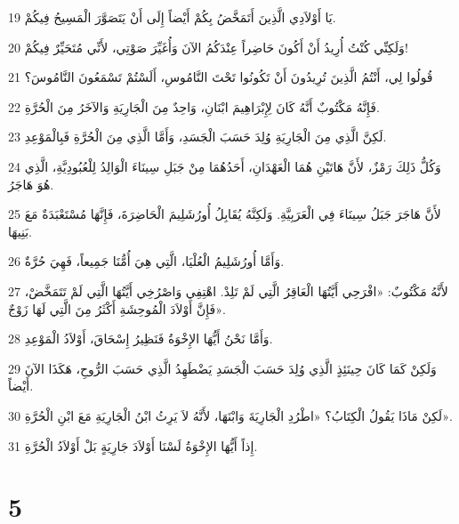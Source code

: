 \par 19 يَا أَوْلاَدِي الَّذِينَ أَتَمَخَّضُ بِكُمْ أَيْضاً إِلَى أَنْ يَتَصَوَّرَ الْمَسِيحُ فِيكُمْ.
\par 20 وَلَكِنِّي كُنْتُ أُرِيدُ أَنْ أَكُونَ حَاضِراً عِنْدَكُمُ الآنَ وَأُغَيِّرَ صَوْتِي، لأَنِّي مُتَحَيِّرٌ فِيكُمْ!
\par 21 قُولُوا لِي، أَنْتُمُ الَّذِينَ تُرِيدُونَ أَنْ تَكُونُوا تَحْتَ النَّامُوسِ، أَلَسْتُمْ تَسْمَعُونَ النَّامُوسَ؟
\par 22 فَإِنَّهُ مَكْتُوبٌ أَنَّهُ كَانَ لِإِبْرَاهِيمَ ابْنَانِ، وَاحِدٌ مِنَ الْجَارِيَةِ وَالآخَرُ مِنَ الْحُرَّةِ.
\par 23 لَكِنَّ الَّذِي مِنَ الْجَارِيَةِ وُلِدَ حَسَبَ الْجَسَدِ، وَأَمَّا الَّذِي مِنَ الْحُرَّةِ فَبِالْمَوْعِدِ.
\par 24 وَكُلُّ ذَلِكَ رَمْزٌ، لأَنَّ هَاتَيْنِ هُمَا الْعَهْدَانِ، أَحَدُهُمَا مِنْ جَبَلِ سِينَاءَ الْوَالِدُ لِلْعُبُودِيَّةِ، الَّذِي هُوَ هَاجَرُ.
\par 25 لأَنَّ هَاجَرَ جَبَلُ سِينَاءَ فِي الْعَرَبِيَّةِ. وَلَكِنَّهُ يُقَابِلُ أُورُشَلِيمَ الْحَاضِرَةَ، فَإِنَّهَا مُسْتَعْبَدَةٌ مَعَ بَنِيهَا.
\par 26 وَأَمَّا أُورُشَلِيمُ الْعُلْيَا، الَّتِي هِيَ أُمُّنَا جَمِيعاً، فَهِيَ حُرَّةٌ.
\par 27 لأَنَّهُ مَكْتُوبٌ: «افْرَحِي أَيَّتُهَا الْعَاقِرُ الَّتِي لَمْ تَلِدْ. اهْتِفِي وَاصْرُخِي أَيَّتُهَا الَّتِي لَمْ تَتَمَخَّضْ، فَإِنَّ أَوْلاَدَ الْمُوحِشَةِ أَكْثَرُ مِنَ الَّتِي لَهَا زَوْجٌ».
\par 28 وَأَمَّا نَحْنُ أَيُّهَا الإِخْوَةُ فَنَظِيرُ إِسْحَاقَ، أَوْلاَدُ الْمَوْعِدِ.
\par 29 وَلَكِنْ كَمَا كَانَ حِينَئِذٍ الَّذِي وُلِدَ حَسَبَ الْجَسَدِ يَضْطَهِدُ الَّذِي حَسَبَ الرُّوحِ، هَكَذَا الآنَ أَيْضاً.
\par 30 لَكِنْ مَاذَا يَقُولُ الْكِتَابُ؟ «اطْرُدِ الْجَارِيَةَ وَابْنَهَا، لأَنَّهُ لاَ يَرِثُ ابْنُ الْجَارِيَةِ مَعَ ابْنِ الْحُرَّةِ».
\par 31 إِذاً أَيُّهَا الإِخْوَةُ لَسْنَا أَوْلاَدَ جَارِيَةٍ بَلْ أَوْلاَدُ الْحُرَّةِ.

\chapter{5}

